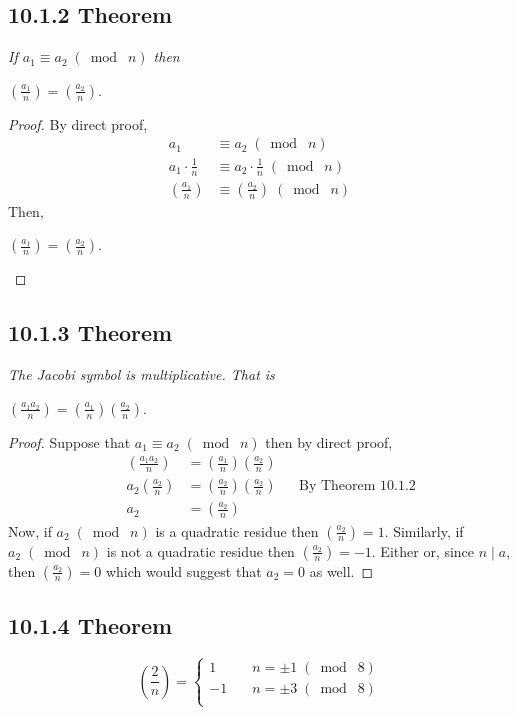 \documentclass{article}
\begin{document}
\subsection*{10.1.2 Theorem} 
\quad \textit{If $a_1 \equiv a_2 \;(\bmod\; n)$ then}
\begin{center}
    $(\frac{a_1}{n}) = (\frac{a_2}{n})$.
\end{center}

\begin{proof}
By direct proof,
\begin{align*}
    &&a_1 &\equiv a_2 \;(\bmod\; n) &&\\
    &&a_1 \cdot \frac{1}{n} &\equiv a_2 \cdot \frac{1}{n} \;(\bmod\; n) &&\\
    &&(\frac{a_1}{n}) &\equiv (\frac{a_2}{n}) \;(\bmod\; n) &&
\end{align*}
Then,
\begin{center}
    $(\frac{a_1}{n}) = (\frac{a_2}{n})$.
\end{center}
\end{proof}

\subsection*{10.1.3 Theorem} 
\quad \textit{The Jacobi symbol is multiplicative. That is}
\begin{center}
    $(\frac{a_1a_2}{n}) = (\frac{a_1}{n})(\frac{a_2}{n})$.
\end{center}

\begin{proof}
Suppose that $a_1 \equiv a_2 \;(\bmod\; n)$ then by direct proof,
\begin{align*}
    &&(\frac{a_1a_2}{n}) &= (\frac{a_1}{n})(\frac{a_2}{n}) &&\\
    &&a_2(\frac{a_2}{n}) &= (\frac{a_2}{n})(\frac{a_2}{n}) && \text{By Theorem 10.1.2}\\
    &&a_2 &= (\frac{a_2}{n}) &&
\end{align*}
Now, if $a_2 \;(\bmod\; n)$ is a quadratic residue then $(\frac{a_2}{n}) = 1$. Similarly, if $a_2 \;(\bmod\; n)$ is not a quadratic residue then $(\frac{a_2}{n}) = -1$. Either or, since $n \mid a$, then $(\frac{a_2}{n}) = 0$ which would suggest that $a_2 = 0$ as well.
\end{proof}

\subsection*{10.1.4 Theorem} 
\quad
\begin{equation*}
(\frac{2}{n}) = \left\{
        \begin{array}{ll}
            1 & \quad n = \pm 1 \;(\bmod\; 8)\\
            -1 & \quad n = \pm 3 \;(\bmod\; 8)\\
        \end{array}
    \right.
\end{equation*}
\end{document}
